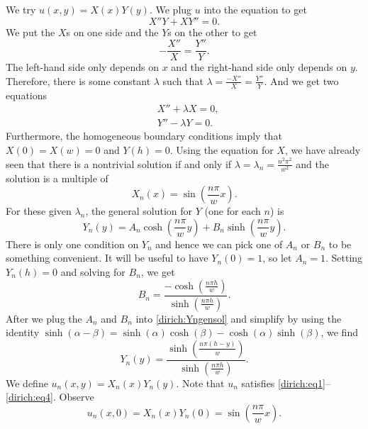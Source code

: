 We try $u(x,y) = X(x)Y(y)$.  We plug $u$ into the equation to get
\begin{equation*}
X''Y + XY'' = 0 .
\end{equation*}
We put the $X$s on one side and the $Y$s on the other to get
\begin{equation*}
- \frac{X''}{X} = \frac{Y''}{Y} .
\end{equation*}
The left-hand side only depends on $x$ and the right-hand side only depends
on $y$.  Therefore, there is some constant $\lambda$ such that
$\lambda = \frac{-X''}{X} = \frac{Y''}{Y}$.
And we get two equations
\begin{align*}
& X'' + \lambda X = 0 , \\
& Y'' - \lambda Y = 0 .
\end{align*}
Furthermore, the homogeneous boundary conditions imply that
$X(0) = X(w) = 0$ and $Y(h) = 0$.  Using the equation for $X$,
we have already seen that there is a nontrivial solution if and only if
$\lambda = \lambda_n = \frac{n^2 \pi^2}{w^2}$ and the solution is
a multiple of
\begin{equation*}
X_n(x) = \sin \left( \frac{n \pi}{w} x \right) .
\end{equation*}
For these given $\lambda_n$,
the general solution for $Y$ (one for each $n$) is
\begin{equation} \label{dirich:Yngensol}
Y_n(y) = A_n \cosh \left( \frac{n \pi}{w} y \right)
+ B_n \sinh \left( \frac{n \pi}{w} y \right) .
\end{equation}
There is only one condition on $Y_n$ and hence we can pick one of $A_n$
or $B_n$
to be something convenient.
It will be useful to have $Y_n(0) = 1$, so let $A_n=1$.
Setting $Y_n(h) = 0$ and solving for $B_n$, we get
\begin{equation*}
B_n = \frac{- \cosh \left( \frac{n \pi h }{w} \right)}%
{\sinh \left( \frac{n \pi h }{w} \right)} .
\end{equation*}
After we plug the $A_n$ and $B_n$
into \eqref{dirich:Yngensol} and simplify by using
the identity $\sinh(\alpha-\beta) =
\sinh(\alpha) \cosh(\beta) -
\cosh(\alpha) \sinh(\beta)$, we find
\begin{equation*}
Y_n(y) =
\frac{\sinh \left( \frac{n \pi (h-y) }{w} \right)}%
{\sinh \left( \frac{n \pi h }{w} \right)} .
\end{equation*}
We define $u_n(x,y) = X_n(x)Y_n(y)$.
Note that $u_n$
satisfies \eqref{dirich:eq1}--\eqref{dirich:eq4}.
Observe
\begin{equation*}
u_n(x,0) = X_n(x)Y_n(0) = \sin \left( \frac{n \pi}{w} x \right) .
\end{equation*}
